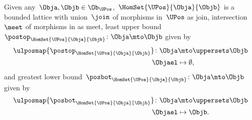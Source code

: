 \begin{lemma}
    \label{lem:UPos-is-bounded-lattice}
    Given any~$\Obja,\Objb\in \Ob_\UPos$,~$\HomSet{\UPos}{\Obja}{\Objb}$ is a bounded lattice with union~$\join$ of morphisms in~$\UPos$ as join, intersection~$\meet$ of morphisms in \UPos as meet, least upper bound~$\postop_{\HomSet{\UPos}{\Obja}{\Objb}}\colon \Obja \mto \Objb$ given by
    \begin{equation*}
        \begin{aligned}
            \ulposmap{\postop_{\HomSet{\UPos}{\Obja}{\Objb}}}\colon \Obja & \mto \uppersets \Objb \\
            \Objael                                                       & \mapsto \emptyset,
        \end{aligned}
    \end{equation*}
    and greatest lower bound~$\posbot_{\HomSet{\UPos}{\Obja}{\Objb}}\colon \Obja \mto \Objb$ given by
    \begin{equation*}
        \begin{aligned}
            \ulposmap{\posbot_{\HomSet{\UPos}{\Obja}{\Objb}}}\colon \Obja & \mto \uppersets \Objb \\
            \Objael                                                       & \mapsto \Objb.
        \end{aligned}
    \end{equation*}
\end{lemma}
